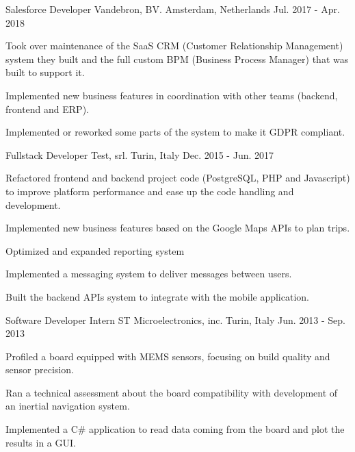 \begin{cventries}
  \cventry
    {Salesforce Developer} %
    {Vandebron, BV.} %
    {Amsterdam, Netherlands} %
    {Jul. 2017 - Apr. 2018} %
    {
      \begin{cvitems} %
        \item {Took over maintenance of the SaaS CRM (Customer Relationship Management) system they built and the full custom BPM (Business Process Manager) that was built to support it.}
        \item {Implemented new business features in coordination with other teams (backend, frontend and ERP).}
        \item {Implemented or reworked some parts of the system to make it GDPR compliant.}
      \end{cvitems}
    }

  \cventry
    {Fullstack Developer} %
    {Test, srl.} %
    {Turin, Italy} %
    {Dec. 2015 - Jun. 2017} %
    {
      \begin{cvitems} %
        \item {Refactored frontend and backend project code (PostgreSQL, PHP and Javascript) to improve platform performance and ease up the code handling and development.}
        \item {Implemented new business features based on the Google Maps APIs to plan trips.}
        \item {Optimized and expanded reporting system}
        \item {Implemented a messaging system to deliver messages between users.}
        \item {Built the backend APIs system to integrate with the mobile application.}
      \end{cvitems}
    }   

  \cventry
    {Software Developer Intern} %
    {ST Microelectronics, inc.} %
    {Turin, Italy} %
    {Jun. 2013 - Sep. 2013} %
    {
      \begin{cvitems} %
        \item {Profiled a board equipped with MEMS sensors, focusing on build quality and sensor precision.}
        \item {Ran a technical assessment about the board compatibility with development of an inertial navigation system.}
        \item {Implemented a C\# application to read data coming from the board and plot the results in a GUI.}
      \end{cvitems}
    }

\end{cventries}
